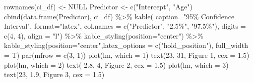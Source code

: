 \documentclass[
]{article}
\newenvironment{Shaded}{\begin{snugshade}}{\end{snugshade}}
\newcommand{\AttributeTok}[1]{\textcolor[rgb]{0.77,0.63,0.00}{#1}}
\newcommand{\ConstantTok}[1]{\textcolor[rgb]{0.00,0.00,0.00}{#1}}
\newcommand{\DecValTok}[1]{\textcolor[rgb]{0.00,0.00,0.81}{#1}}
\newcommand{\FloatTok}[1]{\textcolor[rgb]{0.00,0.00,0.81}{#1}}
\newcommand{\FunctionTok}[1]{\textcolor[rgb]{0.00,0.00,0.00}{#1}}
\newcommand{\NormalTok}[1]{#1}
\newcommand{\OtherTok}[1]{\textcolor[rgb]{0.56,0.35,0.01}{#1}}
\newcommand{\SpecialCharTok}[1]{\textcolor[rgb]{0.00,0.00,0.00}{#1}}
\newcommand{\StringTok}[1]{\textcolor[rgb]{0.31,0.60,0.02}{#1}}
\begin{document}
\begin{Shaded}
\begin{Highlighting}[]
\FunctionTok{rownames}\NormalTok{(ci\_df) }\OtherTok{\textless{}{-}} \ConstantTok{NULL}
\NormalTok{Predictor }\OtherTok{\textless{}{-}} \FunctionTok{c}\NormalTok{(}\StringTok{"Intercept"}\NormalTok{, }\StringTok{"Age"}\NormalTok{)}
\FunctionTok{cbind}\NormalTok{(}\FunctionTok{data.frame}\NormalTok{(Predictor), ci\_df) }\SpecialCharTok{\%\textgreater{}\%}
  \FunctionTok{kable}\NormalTok{( }\AttributeTok{caption=}\StringTok{"95\% Confidence Interval"}\NormalTok{,}
         \AttributeTok{format=}\StringTok{"latex"}\NormalTok{,}
         \AttributeTok{col.names =} \FunctionTok{c}\NormalTok{(}\StringTok{"Predictor"}\NormalTok{, }\StringTok{"2.5\%"}\NormalTok{, }\StringTok{"97.5\%"}\NormalTok{),}
         \AttributeTok{digits =} \FunctionTok{c}\NormalTok{(}\DecValTok{4}\NormalTok{, }\DecValTok{4}\NormalTok{),}
         \AttributeTok{align =} \StringTok{"l"}\NormalTok{) }\SpecialCharTok{\%\textgreater{}\%}
  \FunctionTok{kable\_styling}\NormalTok{(}\AttributeTok{position=}\StringTok{"center"}\NormalTok{) }\SpecialCharTok{\%\textgreater{}\%}
  \FunctionTok{kable\_styling}\NormalTok{(}\AttributeTok{position=}\StringTok{"center"}\NormalTok{,}\AttributeTok{latex\_options =} \FunctionTok{c}\NormalTok{(}\StringTok{"hold\_position"}\NormalTok{), }\AttributeTok{full\_width =}\NormalTok{ T)}
\FunctionTok{par}\NormalTok{(}\AttributeTok{mfrow =} \FunctionTok{c}\NormalTok{(}\DecValTok{3}\NormalTok{, }\DecValTok{1}\NormalTok{))}
\FunctionTok{plot}\NormalTok{(lm, }\AttributeTok{which =} \DecValTok{1}\NormalTok{)}
\FunctionTok{text}\NormalTok{(}\DecValTok{23}\NormalTok{, }\DecValTok{31}\NormalTok{, }\StringTok{\textquotesingle{}Figure 1\textquotesingle{}}\NormalTok{, }\AttributeTok{cex =} \FloatTok{1.5}\NormalTok{)}
\FunctionTok{plot}\NormalTok{(lm, }\AttributeTok{which =} \DecValTok{2}\NormalTok{)}
\FunctionTok{text}\NormalTok{(}\SpecialCharTok{{-}}\FloatTok{2.8}\NormalTok{, }\DecValTok{4}\NormalTok{, }\StringTok{\textquotesingle{}Figure 2\textquotesingle{}}\NormalTok{, }\AttributeTok{cex =} \FloatTok{1.5}\NormalTok{)}
\FunctionTok{plot}\NormalTok{(lm, }\AttributeTok{which =} \DecValTok{3}\NormalTok{)}
\FunctionTok{text}\NormalTok{(}\DecValTok{23}\NormalTok{, }\FloatTok{1.9}\NormalTok{, }\StringTok{\textquotesingle{}Figure 3\textquotesingle{}}\NormalTok{, }\AttributeTok{cex =} \FloatTok{1.5}\NormalTok{)}


\end{Highlighting}
\end{Shaded}
\end{document}

